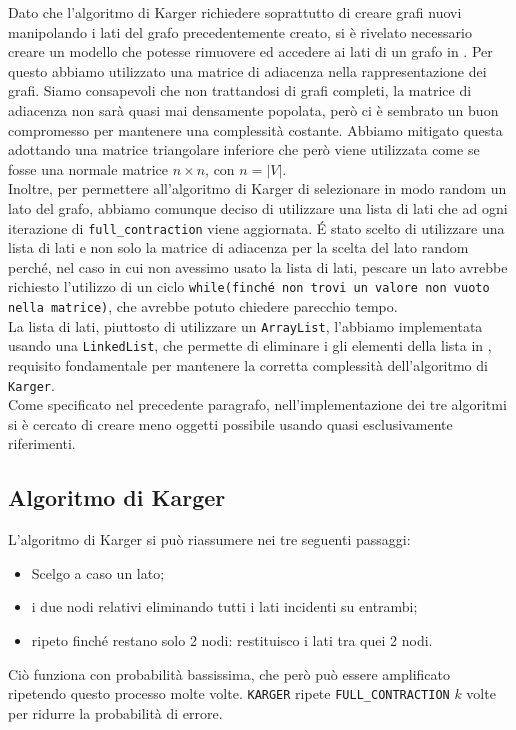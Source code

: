 Dato che l'algoritmo di Karger richiedere soprattutto di creare grafi nuovi manipolando i lati del grafo precedentemente creato, si è rivelato necessario creare un modello che potesse rimuovere ed accedere ai lati di un grafo in . Per questo abbiamo utilizzato una matrice di adiacenza nella rappresentazione dei grafi. Siamo consapevoli che non trattandosi di grafi completi, la matrice di adiacenza non sarà quasi mai densamente popolata, però ci è sembrato un buon compromesso per mantenere una complessità costante. Abbiamo mitigato questa  adottando una matrice triangolare inferiore che però viene utilizzata come se fosse una normale matrice $n\times n$, con $n = |V|$. \\
Inoltre, per permettere all'algoritmo di Karger di selezionare in modo random un lato del grafo, abbiamo comunque deciso di utilizzare una lista di lati che ad ogni iterazione di \texttt{full\_contraction} viene aggiornata. \'E stato scelto di utilizzare una lista di lati e non solo la matrice di adiacenza per la scelta del lato random perché, nel caso in cui non avessimo usato la lista di lati, pescare un lato avrebbe richiesto l'utilizzo di un ciclo \texttt{while(finché non trovi un valore non vuoto nella matrice)}, che avrebbe potuto chiedere parecchio tempo.\\
La lista di lati, piuttosto di utilizzare un \texttt{ArrayList}, l'abbiamo implementata usando una \texttt{LinkedList}, che permette di eliminare i gli elementi della lista in , requisito fondamentale per mantenere la corretta complessità dell'algoritmo di \texttt{Karger}.\\ 
Come specificato nel precedente paragrafo, nell'implementazione dei tre algoritmi si è cercato di creare meno oggetti possibile usando quasi esclusivamente riferimenti. 


\subsection{Algoritmo di Karger}
L'algoritmo di Karger si può riassumere nei tre seguenti passaggi:
\begin{itemize}
	\item Scelgo a caso un lato;
	\item {} i due nodi relativi eliminando tutti i lati incidenti su entrambi;
	\item ripeto finché restano solo 2 nodi: restituisco i lati tra quei 2 nodi.
\end{itemize}
Ciò funziona con probabilità bassissima, che però può essere amplificato ripetendo questo processo molte volte. \eqcapo
{}
\texttt{KARGER} ripete \texttt{FULL\_CONTRACTION} $k$ volte per ridurre la probabilità di errore.

